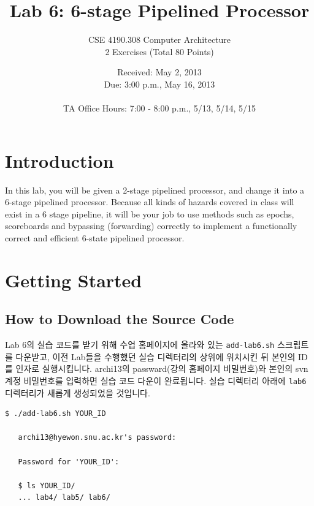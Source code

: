 \documentclass{article}
\begin{document}
\title{Lab 6: 6-stage Pipelined Processor}   %
\author{CSE 4190.308 Computer Architecture \\ 2 Exercises (Total 80 Points) }         
\date{Received: May 2, 2013 \\Due: 3:00 p.m., May 16, 2013\\ \ \\ TA Office Hours: 7:00 - 8:00 p.m., 5/13, 5/14, 5/15}    %
\maketitle

\section{Introduction}

In this lab, you will be given a 2-stage pipelined processor,
and change it into a 6-stage pipelined processor.
Because all kinds of hazards covered in class will exist in a 6 stage
pipeline, it will be your job to use methods such as epochs, scoreboards and bypassing (forwarding)
correctly to implement a functionally correct
and efficient 6-state pipelined processor.


\section{Getting Started}
\subsection{How to Download the Source Code}
Lab 6의 실습 코드를 받기 위해 수업 홈페이지에 올라와 있는 \texttt{add-lab6.sh} 스크립트를 다운받고,
이전 Lab들을 수행했던 실습 디렉터리의 상위에 위치시킨 뒤 본인의 ID를 인자로 실행시킵니다.
archi13의 passward(강의 홈페이지 비밀번호)와 본인의 svn 계정 비밀번호를 입력하면 실습 코드 다운이 완료됩니다.
실습 디렉터리 아래에 \texttt{lab6} 디렉터리가 새롭게 생성되었을 것입니다.

\begin{Verbatim}[frame=single]
   $ ./add-lab6.sh YOUR_ID

   archi13@hyewon.snu.ac.kr's password: 

   Password for 'YOUR_ID': 

   $ ls YOUR_ID/
   ... lab4/ lab5/ lab6/
\end{Verbatim}
\end{document}
